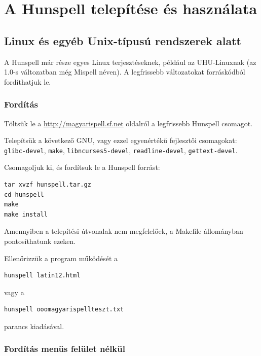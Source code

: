 
\section{A Hunspell telepítése és használata}

\subsection{Linux és egyéb Unix-típusú rendszerek alatt}

A Hunspell már része egyes Linux terjesztéseknek,
például az UHU-Linuxnak (az 1.0-s változatban még
Mispell néven). A legfrissebb változatokat
forráskódból fordíthatjuk le.

\subsubsection{Fordítás}

Töltsük le a \url{http://magyarispell.sf.net} oldalról a
legfrissebb Hunspell csomagot.

Telepítsük a következő GNU, vagy ezzel egyenértékű fejlesztői
csomagokat: \texttt{glibc-devel}, \texttt{make}, \texttt{libncurses5-devel},
\texttt{readline-devel}, \texttt{gettext-devel}.

Csomagoljuk ki, és fordítsuk le a Hunspell forrást:

\begin{verbatim}
tar xvzf hunspell.tar.gz
cd hunspell
make
make install
\end{verbatim}

Amennyiben a telepítési útvonalak nem megfelelőek, a
Makefile állományban pontosíthatunk ezeken.

Ellenőrizzük a program működését a

\begin{verbatim}
hunspell latin12.html
\end{verbatim}

vagy a

\begin{verbatim}
hunspell ooomagyarispellteszt.txt
\end{verbatim}

parancs kiadásával.

\subsubsection{Fordítás menüs felület nélkül}

